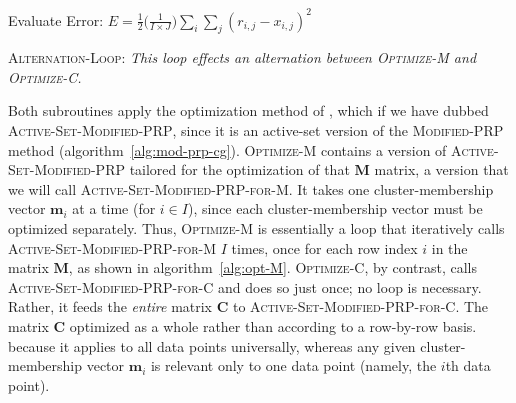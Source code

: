 \begin{algorithm}[th]
 Evaluate Error: $E = \frac{1}{2} \big(\frac{1}{I\times J}\big) \sum_i \sum_j (r_{i,j} - x_{i,j})^2$\;\label{line:init-E-alt} 
\caption{\textsc{Alternation-Loop}: \textit{This loop effects an alternation between \textsc{Optimize-M} and \textsc{Optimize-C}.}}
\label{alg:m-and-c}
\end{algorithm}

Both subroutines apply the 
optimization method of \citet{cheng-and-li:2012}, which if we have 
dubbed \textsc{Active-Set-Modified-PRP}, since it is an active-set version of the 
\textsc{Modified-PRP} method (algorithm~\ref{alg:mod-prp-cg}). 
\textsc{Optimize-M} contains a version of \textsc{Active-Set-Modified-PRP} tailored for
 the optimization of that $\textbf{M}$ matrix, a version that we will call \textsc{Active-Set-Modified-PRP-for-M}.
It takes one cluster-membership vector $\textbf{m}_i$ at a time (for $i \in I$), 
since each cluster-membership vector must be optimized separately. 
Thus, \textsc{Optimize-M} is essentially a loop that iteratively calls 
\textsc{Active-Set-Modified-PRP-for-M} $I$ times, once for each row index $i$ in 
the matrix $\textbf{M}$, as shown in algorithm~\ref{alg:opt-M}.
\textsc{Optimize-C}, by contrast, calls \textsc{Active-Set-Modified-PRP-for-C} and does so just once; no loop is necessary. 
Rather, it feeds the \emph{entire} matrix $\textbf{C}$ to 
\textsc{Active-Set-Modified-PRP-for-C}. The matrix $\textbf{C}$ optimized 
as a whole rather than according to a row-by-row basis.
because it applies to all data points universally, 
whereas any given cluster-membership vector $\textbf{m}_i$ is relevant only to one 
data point (namely, the $i$th data point).

